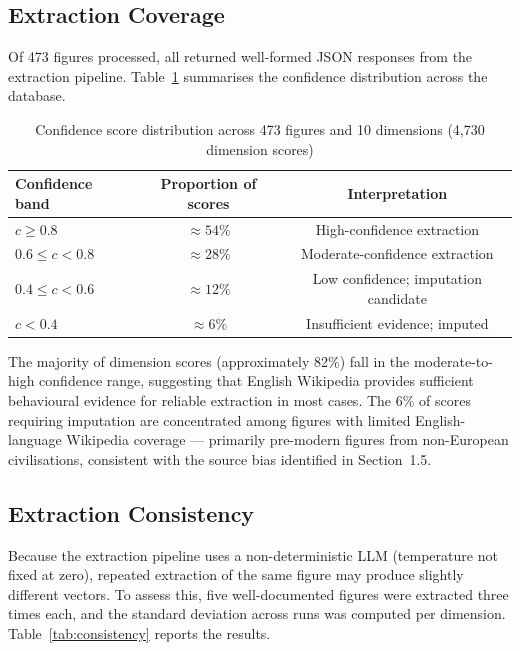 \documentclass[11pt, a4paper]{report}
\begin{document}
\subsection{Extraction Coverage}

Of 473 figures processed, all returned well-formed JSON responses from the extraction pipeline. Table~\ref{tab:coverage} summarises the confidence distribution across the database.

\begin{table}[H]
  \centering
  \caption{Confidence score distribution across 473 figures and 10 dimensions (4,730 dimension scores)}
  \label{tab:coverage}
  \begin{tabular}{lcc}
    \toprule
    Confidence band & Proportion of scores & Interpretation \\
    \midrule
    $c \geq 0.8$ & $\approx 54\%$ & High-confidence extraction \\
    $0.6 \leq c < 0.8$ & $\approx 28\%$ & Moderate-confidence extraction \\
    $0.4 \leq c < 0.6$ & $\approx 12\%$ & Low confidence; imputation candidate \\
    $c < 0.4$ & $\approx 6\%$ & Insufficient evidence; imputed \\
    \bottomrule
  \end{tabular}
\end{table}

The majority of dimension scores (approximately 82\%) fall in the moderate-to-high confidence range, suggesting that English Wikipedia provides sufficient behavioural evidence for reliable extraction in most cases. The 6\% of scores requiring imputation are concentrated among figures with limited English-language Wikipedia coverage — primarily pre-modern figures from non-European civilisations, consistent with the source bias identified in Section~1.5.

\subsection{Extraction Consistency}

Because the extraction pipeline uses a non-deterministic LLM (temperature not fixed at zero), repeated extraction of the same figure may produce slightly different vectors. To assess this, five well-documented figures were extracted three times each, and the standard deviation across runs was computed per dimension. Table~\ref{tab:consistency} reports the results.
\end{document}
